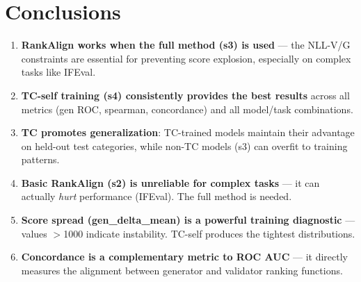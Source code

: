 \documentclass[11pt,a4paper]{article}
\begin{document}
\section{Conclusions}

\begin{enumerate}
\item \textbf{RankAlign works when the full method (s3) is used} --- the NLL-V/G constraints are essential for preventing score explosion, especially on complex tasks like IFEval.
\item \textbf{TC-self training (s4) consistently provides the best results} across all metrics (gen ROC, spearman, concordance) and all model/task combinations.
\item \textbf{TC promotes generalization}: TC-trained models maintain their advantage on held-out test categories, while non-TC models (s3) can overfit to training patterns.
\item \textbf{Basic RankAlign (s2) is unreliable for complex tasks} --- it can actually \emph{hurt} performance (IFEval). The full method is needed.
\item \textbf{Score spread (gen\_delta\_mean) is a powerful training diagnostic} --- values $>$1000 indicate instability. TC-self produces the tightest distributions.
\item \textbf{Concordance is a complementary metric to ROC AUC} --- it directly measures the alignment between generator and validator ranking functions.
\end{enumerate}
\end{document}
